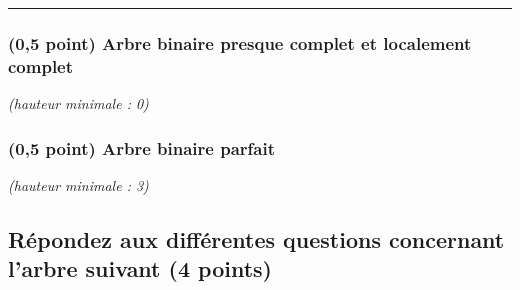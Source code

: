 \documentclass[11pt,a4paper]{article}
\begin{document}
\vspace*{-0.5cm}
\rule{1.0\linewidth}{0.75pt}

\begin{table}[ht!]
  \centering
  \begin{minipage}{0.50\textwidth}
    \centering

\subsubsection{(0,5 point) Arbre binaire presque complet et localement complet}

\textit{(hauteur minimale : 0)}

  \end{minipage}
  \hfillx
  \begin{minipage}{0.50\textwidth}
    \centering

\subsubsection{(0,5 point) Arbre binaire parfait}

\textit{(hauteur minimale : 3)}

  \end{minipage}
\end{table}

\clearpage


\subsection{Répondez aux différentes questions concernant l'arbre suivant (4 points) }

\bigskip
\end{document}
